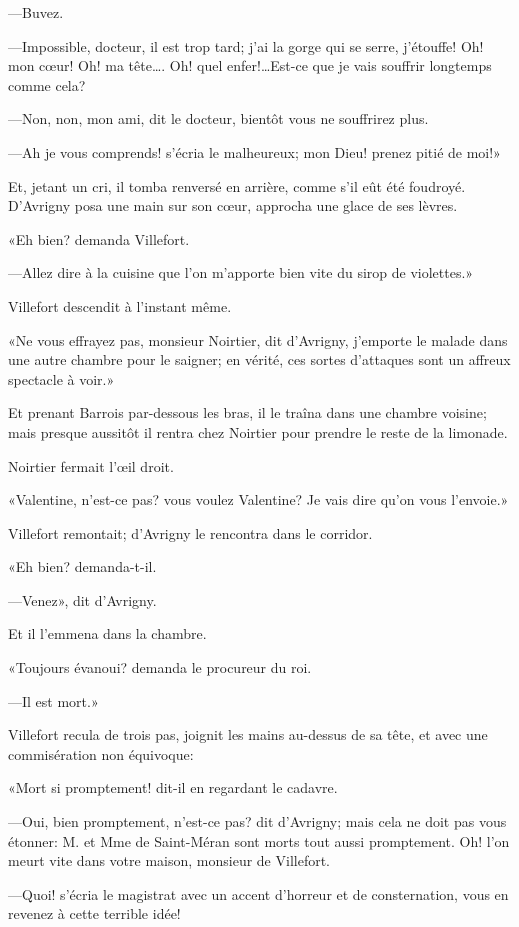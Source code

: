 —Buvez. 

—Impossible, docteur, il est trop tard; j'ai la gorge qui se serre, j'étouffe! Oh! mon cœur! Oh! ma tête\dots. Oh! quel enfer!\dots Est-ce que je vais souffrir longtemps comme cela?  

—Non, non, mon ami, dit le docteur, bientôt vous ne souffrirez plus. 

—Ah je vous comprends! s'écria le malheureux; mon Dieu! prenez pitié de moi!» 

Et, jetant un cri, il tomba renversé en arrière, comme s'il eût été foudroyé. D'Avrigny posa une main sur son cœur, approcha une glace de ses lèvres. 

«Eh bien? demanda Villefort. 

—Allez dire à la cuisine que l'on m'apporte bien vite du sirop de violettes.» 

Villefort descendit à l'instant même. 

«Ne vous effrayez pas, monsieur Noirtier, dit d'Avrigny, j'emporte le malade dans une autre chambre pour le saigner; en vérité, ces sortes d'attaques sont un affreux spectacle à voir.» 

Et prenant Barrois par-dessous les bras, il le traîna dans une chambre voisine; mais presque aussitôt il rentra chez Noirtier pour prendre le reste de la limonade. 

Noirtier fermait l'œil droit. 

«Valentine, n'est-ce pas? vous voulez Valentine? Je vais dire qu'on vous l'envoie.» 

Villefort remontait; d'Avrigny le rencontra dans le corridor. 

«Eh bien? demanda-t-il. 

—Venez», dit d'Avrigny. 

Et il l'emmena dans la chambre. 

«Toujours évanoui? demanda le procureur du roi. 

—Il est mort.» 

Villefort recula de trois pas, joignit les mains au-dessus de sa tête, et avec une commisération non équivoque: 

«Mort si promptement! dit-il en regardant le cadavre. 

—Oui, bien promptement, n'est-ce pas? dit d'Avrigny; mais cela ne doit pas vous étonner: M. et Mme de Saint-Méran sont morts tout aussi promptement. Oh! l'on meurt vite dans votre maison, monsieur de Villefort. 

—Quoi! s'écria le magistrat avec un accent d'horreur et de consternation, vous en revenez à cette terrible idée! 

